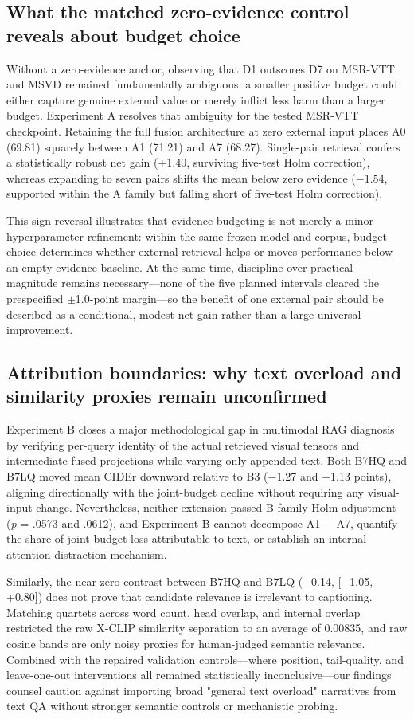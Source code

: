 \documentclass[11pt,a4paper]{article}
\begin{document}
\subsection{What the matched zero-evidence control reveals about budget choice}
Without a zero-evidence anchor, observing that D1 outscores D7 on MSR-VTT and MSVD remained fundamentally ambiguous: a smaller positive budget could either capture genuine external value or merely inflict less harm than a larger budget. Experiment A resolves that ambiguity for the tested MSR-VTT checkpoint. Retaining the full fusion architecture at zero external input places A0 (69.81) squarely between A1 (71.21) and A7 (68.27). Single-pair retrieval confers a statistically robust net gain (+1.40, surviving five-test Holm correction), whereas expanding to seven pairs shifts the mean below zero evidence ($-$1.54, supported within the A family but falling short of five-test Holm correction).

This sign reversal illustrates that evidence budgeting is not merely a minor hyperparameter refinement: within the same frozen model and corpus, budget choice determines whether external retrieval helps or moves performance below an empty-evidence baseline. At the same time, discipline over practical magnitude remains necessary---none of the five planned intervals cleared the prespecified $\pm$1.0-point margin---so the benefit of one external pair should be described as a conditional, modest net gain rather than a large universal improvement.

\subsection{Attribution boundaries: why text overload and similarity proxies remain unconfirmed}
Experiment B closes a major methodological gap in multimodal RAG diagnosis by verifying per-query identity of the actual retrieved visual tensors and intermediate fused projections while varying only appended text. Both B7HQ and B7LQ moved mean CIDEr downward relative to B3 ($-$1.27 and $-$1.13 points), aligning directionally with the joint-budget decline without requiring any visual-input change. Nevertheless, neither extension passed B-family Holm adjustment (\emph{p} = .0573 and .0612), and Experiment B cannot decompose A1 $-$ A7, quantify the share of joint-budget loss attributable to text, or establish an internal attention-distraction mechanism.

Similarly, the near-zero contrast between B7HQ and B7LQ ($-$0.14, [$-$1.05, +0.80]) does not prove that candidate relevance is irrelevant to captioning. Matching quartets across word count, head overlap, and internal overlap restricted the raw X-CLIP similarity separation to an average of 0.00835, and raw cosine bands are only noisy proxies for human-judged semantic relevance. Combined with the repaired validation controls---where position, tail-quality, and leave-one-out interventions all remained statistically inconclusive---our findings counsel caution against importing broad "general text overload" narratives from text QA without stronger semantic controls or mechanistic probing.
\end{document}
